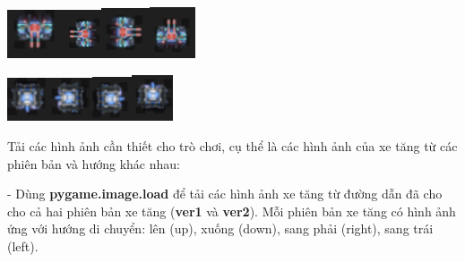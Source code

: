 \documentclass[a4paper]{article}
\begin{document}
\includegraphics[width=0.65417in,height=0.56111in]{image36.png}\includegraphics[width=0.43889in,height=0.5625in]{image37.png}\includegraphics[width=0.55833in,height=0.58333in]{image38.png}\includegraphics[width=0.53611in,height=0.59583in]{image39.png}

\includegraphics[width=0.47361in,height=0.5in]{image41.png}\includegraphics[width=0.51111in,height=0.5in]{image42.png}\includegraphics[width=0.4625in,height=0.51389in]{image43.png}\includegraphics[width=0.47639in,height=0.5375in]{image44.png}

Tải các hình ảnh cần thiết cho trò chơi, cụ thể là các hình ảnh của xe
tăng từ các phiên bản và hướng khác nhau:

- Dùng \textbf{pygame.image.load} để tải các hình ảnh xe tăng từ đường
dẫn đã cho cho cả hai phiên bản xe tăng (\textbf{ver1} và
\textbf{ver2}). Mỗi phiên bản xe tăng có hình ảnh ứng với hướng di
chuyển: lên (up), xuống (down), sang phải (right), sang trái (left).
\end{document}
